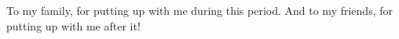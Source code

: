 \begin{dedicatoria}
   \vspace*{\fill}

{%
	\noindent\hspace{.5\textwidth}
	{\begin{minipage}{.5\textwidth}
			\begin{flushleft}
				To my family, for putting up with me during this period. And to my friends, for putting up with me after it!
			\end{flushleft}
	\end{minipage}}%
\vspace*{3cm}
}%

\end{dedicatoria}
